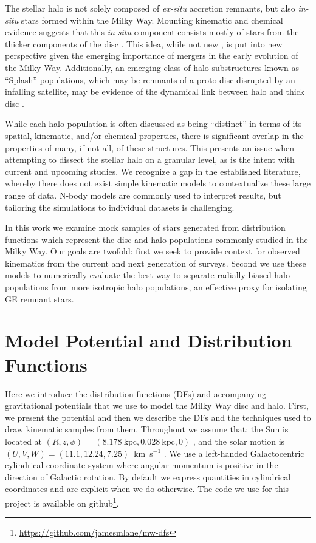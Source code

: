 The stellar halo is not solely composed of \textit{ex-situ} accretion remnants, but also \textit{in-situ} stars formed within the Milky Way. Mounting kinematic and chemical evidence suggests that this \textit{in-situ} component consists mostly of stars from the thicker components of the disc \citep{helmi18,haywood18,dimatteo19}. This idea, while not new \citep[e.g.][]{nissen10}, is put into new perspective given the emerging importance of mergers in the early evolution of the Milky Way. Additionally, an emerging class of halo substructures known as ``Splash'' populations, which may be remnants of a proto-disc disrupted by an infalling satellite, may be evidence of the dynamical link between halo and thick disc \citep{belokurov20,naidu20,lian20}.

While each halo population is often discussed as being ``distinct'' in terms of its spatial, kinematic, and/or chemical properties, there is significant overlap in the properties of many, if not all, of these structures. This presents an issue when attempting to dissect the stellar halo on a granular level, as is the intent with current and upcoming studies. We recognize a gap in the established literature, whereby there does not exist simple kinematic models to contextualize these large range of data. N-body models are commonly used to interpret results, but tailoring the simulations to individual datasets is challenging.

In this work we examine mock samples of stars generated from distribution functions which represent the disc and halo populations commonly studied in the Milky Way. Our goals are twofold: first we seek to provide context for observed kinematics from the current and next generation of surveys. Second we use these models to numerically evaluate the best way to separate radially biased halo populations from more isotropic halo populations, an effective proxy for isolating GE remnant stars.

\section{Model Potential and Distribution Functions}
\label{sec:ModelPotentialandDistributionFunctions}

Here we introduce the distribution functions (DFs) and accompanying gravitational potentials that we use to model the Milky Way disc and halo. First, we present the potential and then we describe the DFs and the techniques used to draw kinematic samples from them. Throughout we assume that: the Sun is located at $(R,z,\phi)$ = $(8.178~\text{kpc}, 0.028~\text{kpc}, 0)$ \citep{gravity19,bennett19}, and the solar motion is $(U,V,W) = (11.1, 12.24, 7.25)$~km~s$^{-1}$ \citep{schoenrich10}. We use a left-handed Galactocentric cylindrical coordinate system where angular momentum is positive in the direction of Galactic rotation. By default we express quantities in cylindrical coordinates and are explicit when we do otherwise. The code we use for this project is available on github\footnote{\url{https://github.com/jamesmlane/mw-dfs}}.


